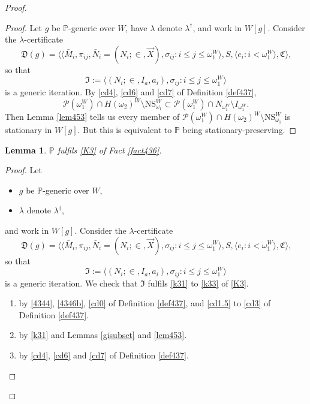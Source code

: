 \documentclass[12pt, twoside]{memoir}
\numberwithin{equation}{section}
\newtheorem{lem}[thm]{Lemma}
\theoremstyle{definition}
\theoremstyle{remark}
\theoremstyle{definition}
\theoremstyle{definition}
\theoremstyle{definition}
\theoremstyle{remark}
\begin{document}
\begin{proof}
\begin{proof}
Let $g$ be $\mathbb{P}$-generic over $W$, have $\lambda$ denote $\lambda^{\dagger}$, and work in $W[g]$. Consider the $\lambda$-certificate
\begin{equation*}
    \mathfrak{D}(g) = \langle \langle \bar{M}_i, \pi_{ij},  \bar{N}_i = (N_i; \in, \Vec{X}), \sigma_{ij} : i \leq j \leq \omega_1^{W} \rangle, S, \langle e_i : i < \omega_1^W \rangle, \mathfrak{C} \rangle \text{,}
\end{equation*}
so that 
\begin{equation*}
    \mathfrak{I} := \langle (N_i; \in, I_a, a_i), \sigma_{ij} : i \leq j \leq \omega_1^{W} \rangle
\end{equation*}
is a generic iteration. By \ref{cd4}, \ref{cd6} and \ref{cd7} of Definition \ref{def437}, 
\begin{equation*}
    \mathcal{P}(\omega_1^W) \cap H(\omega_2)^W \setminus \mathrm{NS}_{\omega_1}^W \subset \mathcal{P}(\omega_1^W) \cap N_{\omega_1^W} \setminus I_{\omega_1^W} \text{.}
\end{equation*}
Then Lemma \ref{lem453} tells us every member of $\mathcal{P}(\omega_1^W) \cap H(\omega_2)^W \setminus \mathrm{NS}_{\omega_1}^W$ is stationary in $W[g]$. But this is equivalent to $\mathbb{P}$ being stationary-preserving.
\end{proof}

\begin{lem}\label{lem455}
$\mathbb{P}$ fulfils \ref{K3} of Fact \ref{fact436}.
\end{lem}

\begin{proof}
Let 
\begin{itemize}
    \item $g$ be $\mathbb{P}$-generic over $W$,
    \item $\lambda$ denote $\lambda^{\dagger}$, 
\end{itemize} 
and work in $W[g]$. Consider the $\lambda$-certificate
\begin{equation*}
    \mathfrak{D}(g) = \langle \langle \bar{M}_i, \pi_{ij},  \bar{N}_i = (N_i; \in, \Vec{X}), \sigma_{ij} : i \leq j \leq \omega_1^{W} \rangle, S, \langle e_i : i < \omega_1^W \rangle, \mathfrak{C} \rangle \text{,}
\end{equation*}
so that 
\begin{equation*}
    \mathfrak{I} := \langle (N_i; \in, I_a, a_i), \sigma_{ij} : i \leq j \leq \omega_1^{W} \rangle
\end{equation*}
is a generic iteration. We check that $\mathfrak{I}$ fulfils \ref{k31} to \ref{k33} of \ref{K3}.
\begin{enumerate}[label=That \ref{k3\arabic*} holds:, leftmargin=100pt]
    \item by \ref{4344}, \ref{4346b}, \ref{cd0} of Definition \ref{def437}, and \ref{cd1.5} to \ref{cd3} of Definition \ref{def437}.
    \item by \ref{k31} and Lemmas \ref{gisubset} and \ref{lem453}.
    \item by \ref{cd4}, \ref{cd6} and \ref{cd7} of Definition \ref{def437}. \qedhere
\end{enumerate}
\end{proof}


\end{proof}
\end{document}
